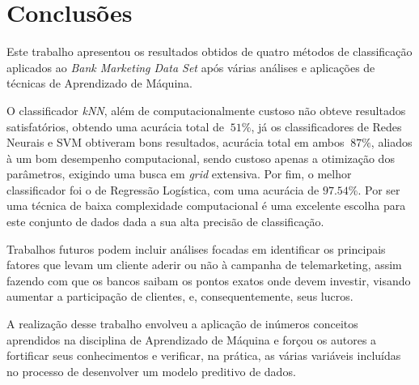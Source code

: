 \section{Conclusões}
Este trabalho apresentou os resultados obtidos de quatro métodos de classificação aplicados ao \emph{Bank Marketing Data Set}\cite{bank_dataset} após várias análises e aplicações de técnicas de Aprendizado de Máquina. 

O classificador \emph{kNN}, além de computacionalmente custoso não obteve resultados satisfatórios, obtendo uma acurácia total de $~51\%$, já os classificadores de Redes Neurais e SVM obtiveram bons resultados, acurácia total em ambos $~87\%$, aliados à um bom desempenho computacional, sendo custoso apenas a otimização dos parâmetros, exigindo uma busca em \emph{grid} extensiva. Por fim, o melhor classificador foi o de Regressão Logística, com uma acurácia de $97.54\%$. Por ser uma técnica de baixa complexidade computacional é uma excelente escolha para este conjunto de dados dada a sua alta precisão de classificação.

Trabalhos futuros podem incluir análises focadas em identificar os principais fatores que levam um cliente aderir ou não à campanha de telemarketing, assim fazendo com que os bancos saibam os pontos exatos onde devem investir, visando aumentar a participação de clientes, e, consequentemente, seus lucros.

A realização desse trabalho envolveu a aplicação de inúmeros conceitos aprendidos na disciplina de Aprendizado de Máquina e forçou os autores a fortificar seus conhecimentos e verificar, na prática, as várias variáveis incluídas no processo de desenvolver um modelo preditivo de dados.